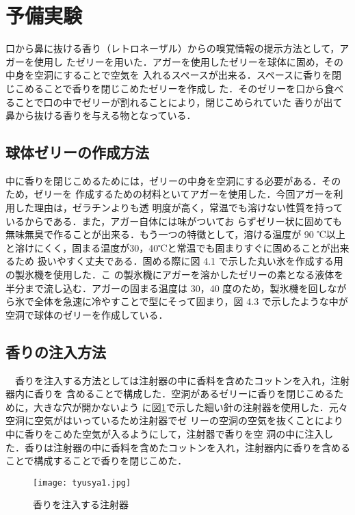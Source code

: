 \section{予備実験}

口から鼻に抜ける香り（レトロネーザル）からの嗅覚情報の提示方法として，アガーを使用し
たゼリーを用いた．アガーを使用したゼリーを球体に固め，その中身を空洞にすることで空気を
入れるスペースが出来る．スペースに香りを閉じこめることで香りを閉じこめたゼリーを作成し
た．そのゼリーを口から食べることで口の中でゼリーが割れることにより，閉じこめられていた
香りが出て鼻から抜ける香りを与える物となっている．


\subsection{球体ゼリーの作成方法}

中に香りを閉じこめるためには，ゼリーの中身を空洞にする必要がある．そのため，ゼリーを
作成するための材料といてアガーを使用した．今回アガーを利用した理由は，ゼラチンよりも透
明度が高く，常温でも溶けない性質を持っているからである．また，アガー自体には味がついてお
らずゼリー状に固めても無味無臭で作ることが出来る．もう一つの特徴として，溶ける温度が 90
℃以上と溶けにくく，固まる温度が30，40℃と常温でも固まりすぐに固めることが出来るため
扱いやすく丈夫である．固める際に図 4.1 で示した丸い氷を作成する用の製氷機を使用した．こ
の製氷機にアガーを溶かしたゼリーの素となる液体を半分まで流し込む．アガーの固まる温度は
30，40 度のため，製氷機を回しながら氷で全体を急速に冷やすことで型にそって固まり，図 4.3
で示したような中が空洞で球体のゼリーを作成している．


\subsection{香りの注入方法}
　香りを注入する方法としては注射器の中に香料を含めたコットンを入れ，注射器内に香りを
含めることで構成した．空洞があるゼリーに香りを閉じこめるために，大きな穴が開かないよう
に図\ref{tyusya}で示した細い針の注射器を使用した．元々空洞に空気がはいっているため注射器でゼ
リーの空洞の空気を抜くことにより中に香りをこめた空気が入るようにして，注射器で香りを空
洞の中に注入した．香りは注射器の中に香料を含めたコットンを入れ，注射器内に香りを含める
ことで構成することで香りを閉じこめた．

\begin{figure}[t]
    \centering
    \texttt{[image: tyusya1.jpg]}
    \caption{香りを注入する注射器}
    \label{tyusya}
  \end{figure}


